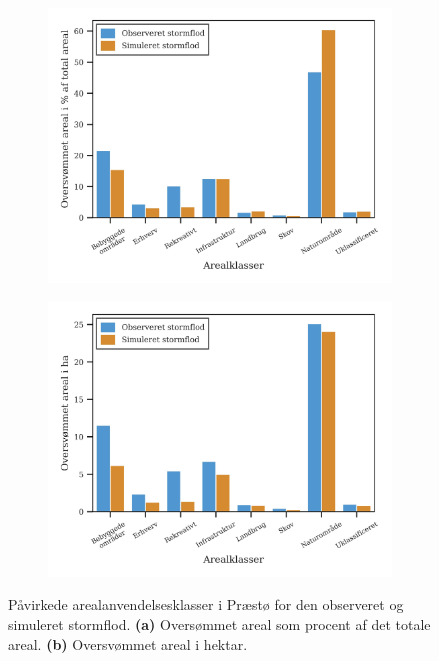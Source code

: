 \begin{figure}[H]
    \begin{subfigure}[b]{0.5\textwidth}
        \centering
        \includegraphics[width=1\linewidth]{images/Resultater/areal_anvendelses_grafer/praestoe_arealanvendelse.jpg}
        \caption{}
        \label{Subfig: Procent præstø}
    \end{subfigure}
    \begin{subfigure}[b]{0.5\textwidth}
        \centering
        \includegraphics[width=1\linewidth]{images/Resultater/areal_anvendelses_grafer/praestoe_oversvommet_Hektar.jpg}
        \caption{}
        \label{Subfig: Hektar præstø}
    \end{subfigure}
    \caption{Påvirkede arealanvendelsesklasser i Præstø for den observeret og simuleret stormflod. \textbf{(a)} Oversømmet areal som procent af det totale areal. \textbf{(b)} Oversvømmet areal i hektar.}
    \label{Figur: Påvirket arealanvendelse Præstø}
\end{figure}
